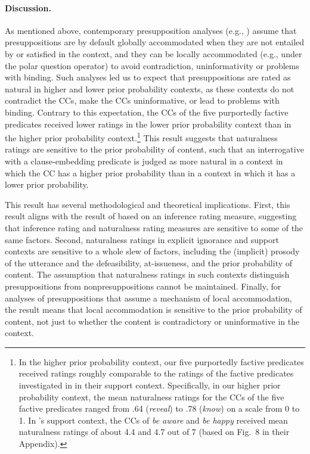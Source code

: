 \documentclass[11pt,fleqn]{article}
\newcommand{\6}{\mbox{$[\hspace*{-.6mm}[$}}
\newcommand{\9}{\mbox{$]\hspace*{-.6mm}]$}}
\newcommand{\citepos}[1]{\citeauthor{#1}'s \citeyear{#1}}
\begin{document}
\paragraph{Discussion.} As mentioned above, contemporary presupposition analyses (e.g., \citealt{heim83,vds92}) assume that presuppositions are by default globally accommodated when they are not entailed by or satisfied in the context, and they can be locally accommodated (e.g., under the polar question operator) to avoid contradiction, uninformativity or problems with binding. Such analyses led us to expect that presuppositions are rated as natural in higher and lower prior probability contexts, as these contexts do not contradict the CCs, make the CCs uninformative, or lead to problems with binding. Contrary to this expectation, the CCs of the five purportedly factive predicates received lower ratings in the lower prior probability context than in the higher prior probability context.\footnote{In the higher prior probability context, our five purportedly factive predicates received ratings roughly comparable to the ratings of the factive predicates investigated in \citealt{mandelkern-etal2020} in their support context. Specifically, in our higher prior probability context, the mean naturalness ratings for the CCs of the five factive predicates ranged from .64 ({\em reveal}) to .78 ({\em know}) on a scale from 0 to 1. In \citepos{mandelkern-etal2020} support context, the CCs of {\em be aware} and {\em be happy} received mean naturalness ratings of about 4.4 and 4.7 out of 7 (based on Fig.~8 in their Appendix).} This result suggests that naturalness ratings are sensitive to the prior probability of content, such that an interrogative with a clause-embedding predicate is judged as more natural in a context in which the CC has a higher prior probability than in a context in which it has a lower prior probability. 

This result has several methodological and theoretical implications. First, this result aligns with the result of \citealt{degen-tonhauser-openmind} based on an inference rating measure, suggesting that inference rating and naturalness rating measures are sensitive to some of the same factors. Second, naturalness ratings in explicit ignorance and support contexts are sensitive to a whole slew of factors, including the (implicit) prosody of the utterance and the defeasibility, at-issueness, and the prior probability of content. The assumption that naturalness ratings in such contexts distinguish presuppositions from nonpresuppositions cannot be maintained.
Finally, for analyses of presuppositions that assume a mechanism of local accommodation, the result means that local accommodation is sensitive to the prior probability of content, not just to whether the content is contradictory or uninformative in the context. 
\end{document}
